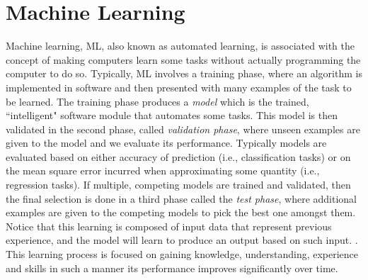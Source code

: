 \documentclass[12pt]{report}
\begin{document}
	\section{Machine Learning}
	
	Machine learning, \ac{ML}, also known as automated learning, is associated with the concept of making computers learn some tasks without actually 
	programming the computer to do so. Typically, \ac{ML} involves a training phase, where an algorithm is implemented in software and then presented
	with many examples of the task to be learned. The training phase produces a {\em model} which is the trained, ``intelligent" software module that automates some tasks. This model is then
	validated in the second phase, called {\em validation phase}, where unseen examples are given to the model and we evaluate its performance. 
	Typically models are evaluated based on either accuracy of prediction (i.e., classification tasks)  or on the mean square error incurred when approximating some quantity (i.e., regression tasks). If multiple, competing  models are trained and validated, then the final selection is done in a third phase called the 
	{\em test phase}, where additional examples are given to the competing models to pick the best one amongst them. 
	Notice that this learning is composed of  input data that represent previous experience, and the model will learn to produce an output based on such input.  \cite{Shai2014}. 
	This learning process is focused on gaining knowledge, understanding, experience and skills \cite{Nilsson1998} in such a manner its performance improves significantly over time.
	
	
\end{document}
